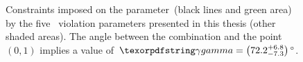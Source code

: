 \begin{figure}[ht]
    \caption{
        Constraints imposed on the parameter~\CPgamma (black lines and green area) by the five \CP~violation parameters presented in this thesis (other shaded areas).
        The angle between the combination and the point~\({(0, 1)}\) implies a value of~\({\CPgamma = \ang[parse-numbers=false]{\left(\num{72.2}_{\num{-7.3}}^{+\num{6.8}}\right)}}\).}
    \label{fig:summary_gamma}
\end{figure}


